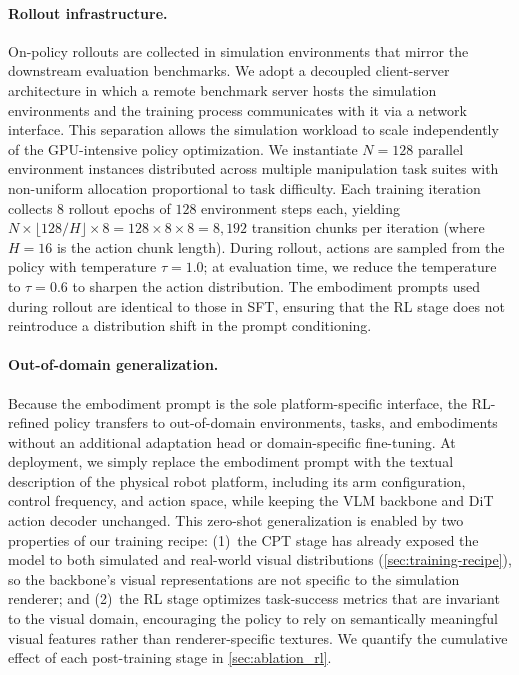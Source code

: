 \documentclass{article}
\begin{document}
\paragraph{Rollout infrastructure.}
On-policy rollouts are collected in simulation environments that mirror the downstream evaluation benchmarks.
We adopt a decoupled client-server architecture in which a remote benchmark server hosts the simulation environments and the training process communicates with it via a network interface.
This separation allows the simulation workload to scale independently of the GPU-intensive policy optimization.
We instantiate $N{=}128$ parallel environment instances distributed across multiple manipulation task suites with non-uniform allocation proportional to task difficulty.
Each training iteration collects $8$ rollout epochs of $128$ environment steps each, yielding $N \times \lfloor 128/H \rfloor \times 8 = 128 \times 8 \times 8 = 8{,}192$ transition chunks per iteration (where $H{=}16$ is the action chunk length).
During rollout, actions are sampled from the policy with temperature $\tau{=}1.0$; at evaluation time, we reduce the temperature to $\tau{=}0.6$ to sharpen the action distribution.
The embodiment prompts used during rollout are identical to those in SFT, ensuring that the RL stage does not reintroduce a distribution shift in the prompt conditioning.

\paragraph{Out-of-domain generalization.}
Because the embodiment prompt is the sole platform-specific interface, the RL-refined policy transfers to out-of-domain environments, tasks, and embodiments without an additional adaptation head or domain-specific fine-tuning.
At deployment, we simply replace the embodiment prompt with the textual description of the physical robot platform, including its arm configuration, control frequency, and action space, while keeping the VLM backbone and DiT action decoder unchanged.
This zero-shot generalization is enabled by two properties of our training recipe: (1)~the CPT stage has already exposed the model to both simulated and real-world visual distributions (\cref{sec:training-recipe}), so the backbone's visual representations are not specific to the simulation renderer; and (2)~the RL stage optimizes task-success metrics that are invariant to the visual domain, encouraging the policy to rely on semantically meaningful visual features rather than renderer-specific textures.
We quantify the cumulative effect of each post-training stage in \cref{sec:ablation_rl}.
\end{document}
